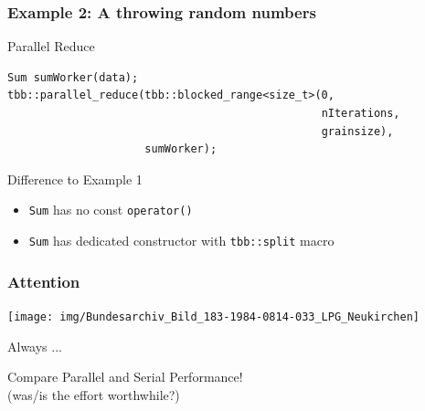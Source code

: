 \documentclass[9pt,pdftex]{beamer}
\begin{document}
\begin{frame}[fragile]
  \frametitle{Example 2: A throwing random numbers}
  
   \begin{block}{Parallel Reduce}
     \small
     \begin{lstlisting}[]
Sum sumWorker(data);
tbb::parallel_reduce(tbb::blocked_range<size_t>(0,
                                                nIterations,
                                                grainsize),
                     sumWorker);
     \end{lstlisting}
   \end{block}

   \begin{block}{Difference to Example 1}
     \begin{itemize}
     \item \texttt{Sum} has no const \texttt{operator()}
     \item \texttt{Sum} has dedicated constructor with \texttt{tbb::split} macro
     \end{itemize}
   \end{block}
\end{frame}

\begin{frame}
  \frametitle{Attention}
  \vfill
  \begin{center}
    \texttt{[image: img/Bundesarchiv\_Bild\_183-1984-0814-033\_LPG\_Neukirchen]}\cite{Wikicommons}
    \begin{alertblock}{Always ...}
      \begin{center}
        Compare Parallel and Serial Performance!\\
        (was/is the effort worthwhile?)
      \end{center}
    \end{alertblock}
  \end{center}

  \vfill
\end{frame}
\end{document}
